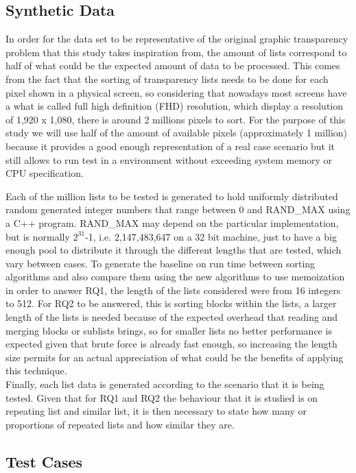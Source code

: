 \documentclass[a4paper,12pt]{article}
\begin{document}
\subsection{Synthetic Data}

In order for the data set to be representative of the original graphic transparency problem that this study takes inspiration from, the amount of lists correspond to half of what could be the expected amount of data to be processed. This comes from the fact that the sorting of transparency lists needs to be done for each pixel shown in a physical screen, so considering that nowadays most screens have a what is called full high definition (FHD) resolution, which display a resolution of 1,920 x 1,080, there is around 2 millions pixels to sort. For the purpose of this study  we will use half of the amount of available pixels (approximately 1 million) because it provides a good enough representation of a real case scenario but it still allows to run test in a environment without exceeding system memory or CPU specification.

Each of the million lists to be tested is generated to hold uniformly distributed random generated integer numbers that range between 0 and RAND\_MAX using a C++ program. RAND\_MAX may depend on the particular implementation, but is normally  $2^{31}$-1, i.e. 2,147,483,647 on a 32 bit machine, just  to have a big enough pool to distribute it through the different lengths that are tested, which vary between cases. To generate the baseline on run time between sorting algorithms and also compare them using the new algorithms to use memoization in order to answer RQ1, the length of the lists considered were from 16 integers to 512. For RQ2 to be answered, this is sorting blocks within the lists, a larger length of the lists is needed because of the expected overhead that reading and merging blocks or sublists brings, so for smaller lists no better performance is expected given that brute force is already fast enough, so increasing the length size permits for an actual appreciation of what could be the benefits of applying this technique.\\

Finally, each list data is generated according to the scenario that it is being tested. Given that for RQ1 and RQ2 the behaviour that it is studied is on repeating list and similar list, it is then necessary to state how many or proportions of repeated lists and how similar they are. 

\subsection{Test Cases}
\end{document}
